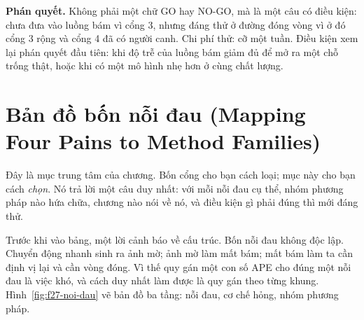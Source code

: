 \documentclass[../../deep_learning.tex]{subfiles}
\begin{document}
\textbf{Phán quyết.} Không phải một chữ GO hay NO-GO, mà là một câu có điều kiện: chưa đưa vào luồng bám vì cổng 3, nhưng đáng thử ở đường đóng vòng vì ở đó cổng 3 rộng và cổng 4 đã có người canh. Chi phí thử: cỡ một tuần. Điều kiện xem lại phán quyết đầu tiên: khi độ trễ của luồng bám giảm đủ để mở ra một chỗ trống thật, hoặc khi có một mô hình nhẹ hơn ở cùng chất lượng.

\section{Bản đồ bốn nỗi đau (Mapping Four Pains to Method Families)}
Đây là mục trung tâm của chương. Bốn cổng cho bạn cách loại; mục này cho bạn cách \emph{chọn}. Nó trả lời một câu duy nhất: với mỗi nỗi đau cụ thể, nhóm phương pháp nào hứa chữa, chương nào nói về nó, và điều kiện gì phải đúng thì mới đáng thử.

Trước khi vào bảng, một lời cảnh báo về cấu trúc. Bốn nỗi đau không độc lập. Chuyển động nhanh sinh ra ảnh mờ; ảnh mờ làm mất bám; mất bám làm ta cần định vị lại và cần vòng đóng. Vì thế quy gán một con số APE cho đúng một nỗi đau là việc khó, và cách duy nhất làm được là quy gán theo từng khung. Hình~\ref{fig:f27-noi-dau} vẽ bản đồ ba tầng: nỗi đau, cơ chế hỏng, nhóm phương pháp.
\end{document}

